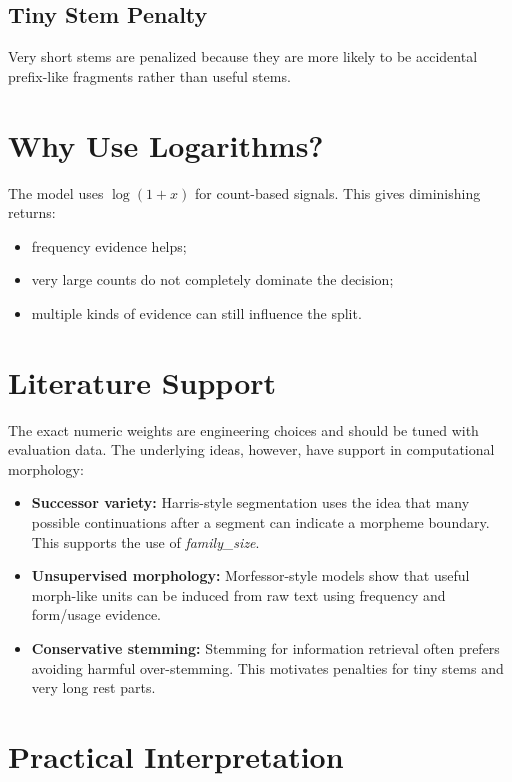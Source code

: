 \documentclass[11pt]{article}
\begin{document}
\subsection*{Tiny Stem Penalty}

Very short stems are penalized because they are more likely to be accidental
prefix-like fragments rather than useful stems.

\section*{Why Use Logarithms?}

The model uses \(\log(1+x)\) for count-based signals. This gives diminishing
returns:

\begin{itemize}
  \item frequency evidence helps;
  \item very large counts do not completely dominate the decision;
  \item multiple kinds of evidence can still influence the split.
\end{itemize}

\section*{Literature Support}

The exact numeric weights are engineering choices and should be tuned with
evaluation data. The underlying ideas, however, have support in computational
morphology:

\begin{itemize}
  \item \textbf{Successor variety:} Harris-style segmentation uses the idea that
  many possible continuations after a segment can indicate a morpheme boundary.
  This supports the use of \textit{family\_size}.

  \item \textbf{Unsupervised morphology:} Morfessor-style models show that useful
  morph-like units can be induced from raw text using frequency and form/usage
  evidence.

  \item \textbf{Conservative stemming:} Stemming for information retrieval often
  prefers avoiding harmful over-stemming. This motivates penalties for tiny stems
  and very long rest parts.
\end{itemize}

\section*{Practical Interpretation}
\end{document}

